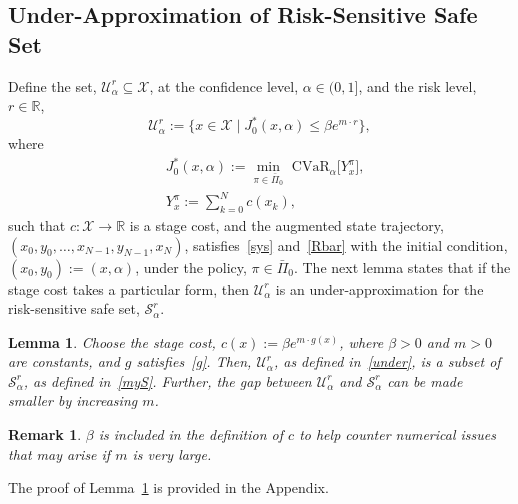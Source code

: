 \documentclass[letterpaper, 10 pt, conference]{ieeeconf}  %
\newtheorem{lemma}{Lemma}
\newtheorem{remark}{Remark}
\begin{document}
\subsection{Under-Approximation of Risk-Sensitive Safe Set}
Define the set, $\mathcal{U}_\alpha^r \subseteq \mathcal{X}$,
at the confidence level, $\alpha \in (0,1]$, and the risk level, $r \in \mathbb{R}$,
%
\begin{equation}\label{under}
\mathcal{U}_\alpha^r := \{x \in \mathcal{X} \mid J_0^*(x,\alpha) \leq \beta e^{m\cdot r} \},
\end{equation}
%
where
%
\begin{equation}\begin{aligned}
& J_0^*(x,\alpha) := {\underset{\pi \in \bar{\Pi}_0}\min} \text{ CVaR}_\alpha \big[ Y_x^\pi \big],\\
& Y_x^\pi := \textstyle\sum_{k=0}^N c(x_k),
\end{aligned}\label{J0}\end{equation}
%
such that $c : \mathcal{X} \to \mathbb{R}$ is a stage cost, and the augmented state trajectory, $(x_0, y_0, \dots, x_{N-1}, y_{N-1}, x_N)$,
satisfies~\eqref{sys} and~\eqref{Rbar} with the initial condition, $(x_0, y_0) := (x, \alpha)$, under the policy, $\pi \in \bar{\Pi}_0$.
The next lemma states that if the stage cost takes a particular form, then $\mathcal{U}_\alpha^r$ is an under-approximation for the risk-sensitive safe set, $\mathcal{S}_\alpha^r$.   
\begin{lemma}\label{lemma2}
Choose the stage cost, $c(x) := \beta e^{m\cdot g(x)}$, where $\beta > 0$ and $m > 0$ are constants, and $g$ satisfies~\eqref{g}.
Then, $\mathcal{U}_\alpha^r$, as defined in~\eqref{under}, is a subset of $\mathcal{S}_\alpha^r$, as defined in~\eqref{myS}. 
Further, the gap between $\mathcal{U}_\alpha^r$ and $\mathcal{S}_\alpha^r$ can be made smaller by increasing $m$.
\end{lemma}
\begin{remark} $\beta$ is included in the definition of $c$ to help counter numerical issues that may arise if $m$ is very large. \end{remark}
The proof of Lemma~\ref{lemma2} is provided in the Appendix.
%
\end{document}
